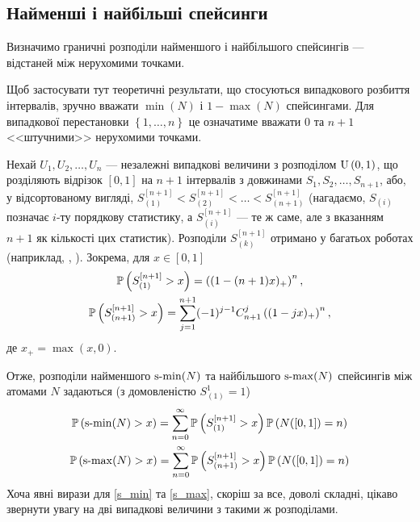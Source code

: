\subsection{Найменші і найбільші спейсинги}
Визначимо граничні розподіли найменшого і найбільшого спейсингів --- відстаней
між нерухомими точками.
\begin{remark}
    Щоб застосувати тут теоретичні результати, що стосуються
    випадкового розбиття інтервалів, зручно вважати
    $\min(N)$ і $1-\max(N)$ спейсингами. Для випадкової
    перестановки $\left\{1, \dots, n\right\}$ це означатиме
    вважати $0$ та $n+1$ <<штучними>> нерухомими точками.
\end{remark}

Нехай $U_1, U_2, \dots, U_{n}$ ---
незалежні випадкові величини
з розподілом $\mathrm{U}\left(0, 1\right)$, що розділяють відрізок $[0, 1]$ на $n+1$
інтервалів з довжинами $S_1, S_2, \dots, S_{n+1}$, або, у відсортованому вигляді, 
$S_{(1)}^{[n+1]} < S_{(2)}^{[n+1]} < \dots < S_{(n+1)}^{[n+1]}$
(нагадаємо, $S_{(i)}$ позначає $i$-ту порядкову статистику, а
$S_{(i)}^{[n+1]}$ --- те ж саме, але з вказанням $n+1$ як кількості цих статистик).
Розподіли $S_{(k)}^{[n+1]}$ отримано у багатьох роботах
(наприклад, \cite{Holst_1980}, \cite{Pinelis_2019}). Зокрема, для $x\in[0,1]$
\begin{gather}
    \label{min_spacing}
    \P{S_{(1)}^{[n+1]} > x} = \left((1-(n+1)x)_+\right)^n, \\
    \label{max_spacing}
    \P{S_{(n+1)}^{[n+1]} > x} = 
    \sum_{j=1}^{n+1} (-1)^{j-1} C_{n+1}^j \left((1-jx)_+\right)^n,
\end{gather}
де $x_+ = \max(x, 0)$.

Отже, розподіли найменшого $\operatorname{s-min}(N)$ та найбільшого $\operatorname{s-max}(N)$ спейсингів 
між атомами $N$ задаються
(з домовленістю $S_{(1)}^{1} = 1$)
\begin{gather}
    \label{s_min}
    \P{\smin(N) > x} = 
    \sum_{n=0}^{\infty} \P{S_{(1)}^{[n+1]} > x} \P{N([0, 1]) = n} \\
    \label{s_max}
    \P{\smax(N) > x} = 
    \sum_{n=0}^{\infty} \P{S_{(n+1)}^{[n+1]} > x} \P{N([0, 1]) = n}
\end{gather}
Хоча явні вирази для \eqref{s_min} та \eqref{s_max},
скоріш за все, доволі складні, цікаво звернути увагу на дві випадкові величини
з такими ж розподілами.


